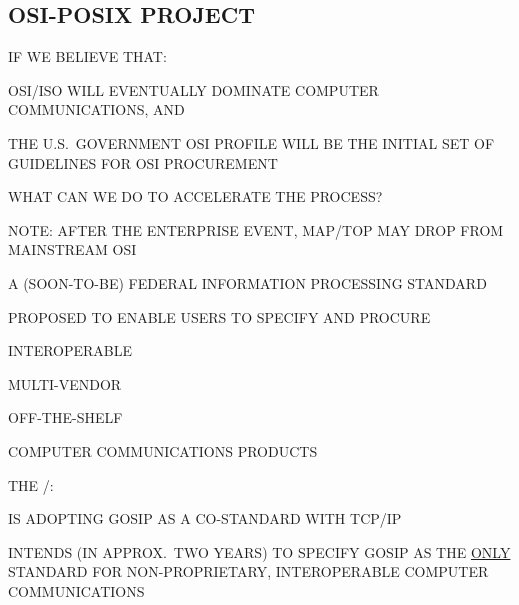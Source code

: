 \begin{bwslide}
\part*	{OSI-POSIX PROJECT}\bf

\begin{nrtc}
\item	IF WE BELIEVE THAT:
    \begin{nrtc}
    \item	OSI/ISO WILL EVENTUALLY DOMINATE COMPUTER COMMUNICATIONS, AND

    \item	THE U.S.~GOVERNMENT OSI PROFILE WILL BE THE INITIAL SET OF
		GUIDELINES FOR OSI PROCUREMENT
    \end{nrtc}

\item	WHAT CAN WE DO TO ACCELERATE THE PROCESS?

\item	NOTE: AFTER THE ENTERPRISE EVENT, MAP/TOP MAY DROP FROM 
	MAINSTREAM OSI
\end{nrtc}
\end{bwslide}


\begin{bwslide}

\begin{nrtc}
\item	A (SOON-TO-BE) FEDERAL INFORMATION PROCESSING STANDARD

\item	PROPOSED TO ENABLE USERS TO SPECIFY AND PROCURE
	\begin{nrtc}
	\item	INTEROPERABLE

	\item	MULTI-VENDOR

	\item	OFF-THE-SHELF
	\end{nrtc}
	COMPUTER COMMUNICATIONS PRODUCTS

\item	THE \dod/:
    \begin{nrtc}
    \item	IS ADOPTING GOSIP AS A CO-STANDARD WITH TCP/IP

    \item	INTENDS (IN APPROX.~TWO YEARS) TO SPECIFY GOSIP AS THE 
		\underline{ONLY} STANDARD FOR NON-PROPRIETARY, INTEROPERABLE
		COMPUTER COMMUNICATIONS
    \end{nrtc}
\end{nrtc}
\end{bwslide}


